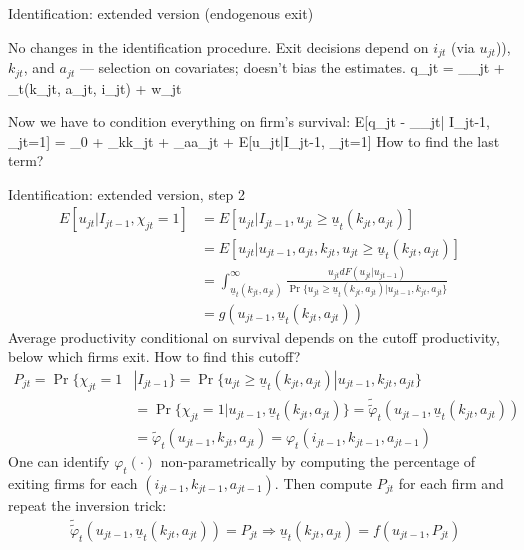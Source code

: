 \begin{frame}{Identification: extended version (endogenous exit)}
	\bi
	\item[Step 1]{
	No changes in the identification procedure. Exit decisions depend on $i_{jt}$ (via $u_{jt}$)), $k_{jt}$, and $a_{jt}$ --- selection on covariates; doesn't bias the estimates.
	\be
			q_{jt} = \beta_\ell\ell_{jt} + \phi_t(k_{jt}, a_{jt}, i_{jt}) + w_{jt}
	\ee}
	\item[Step 2]{
	Now we have to condition everything on firm's survival:
	\be
		E[q_{jt} - \beta_\ell\ell_{jt}| I_{jt-1}, \chi_{jt}=1] = \beta_0 + \beta_kk_{jt} + \beta_aa_{jt} + E[u_{jt}|I_{jt-1}, \chi_{jt}=1]
	\ee}
	How to find the last term?
	\ei
\end{frame}

\begin{frame}{Identification: extended version, step 2}
	\begin{align*}
		E[u_{jt}|I_{jt-1}, \chi_{jt}=1] &= E[u_{jt}|I_{jt-1}, u_{jt}\geq\underline{u}_t(k_{jt}, a_{jt})]\\
		& = E[u_{jt}|u_{jt-1}, a_{jt}, k_{jt}, u_{jt}\geq\underline{u}_t(k_{jt}, a_{jt})] \\
		& = \int_{\underline{u}_t(k_{jt}, a_{jt})}^\infty\frac{u_{jt}dF(u_{jt}|u_{jt-1})}{\Pr\{u_{jt}\geq\underline{u}_t(k_{jt}, a_{jt})|u_{jt-1},k_{jt}, a_{jt}\}}\\
		&= g(u_{jt-1}, \underline{u}_t(k_{jt}, a_{jt}))
	\end{align*}
	Average productivity conditional on survival depends on the cutoff productivity, below which firms exit. How to find this cutoff?
	\begin{align*}
		P_{jt}= \Pr\{\chi_{jt}=1&|I_{jt-1}\} = \Pr\{u_{jt}\geq\underline{u}_t(k_{jt}, a_{jt})|u_{jt-1}, k_{jt}, a_{jt}\}\\
		& = \Pr\{\chi_{jt}=1|u_{jt-1}, \underline{u}_t(k_{jt}, a_{jt})\} = \widetilde{\widetilde{\varphi}}_t(u_{jt-1}, \underline{u}_t(k_{jt}, a_{jt}))\\
		& = \widetilde{\varphi}_t(u_{jt-1}, k_{jt}, a_{jt}) = \varphi_t(i_{jt-1}, k_{jt-1}, a_{jt-1})
	\end{align*}
	One can identify $\varphi_t(\cdot)$ non-parametrically by computing the percentage of exiting firms for each $(i_{jt-1}, k_{jt-1}, a_{jt-1})$. Then compute $P_{jt}$ for each firm and repeat the inversion trick:
	\begin{align*}
		&\widetilde{\widetilde{\varphi}}_t(u_{jt-1},  \underline{u}_t(k_{jt}, a_{jt})) = P_{jt} \Longrightarrow{}\underline{u}_t(k_{jt}, a_{jt}) = f(u_{jt-1}, P_{jt})
	\end{align*}
\end{frame}

